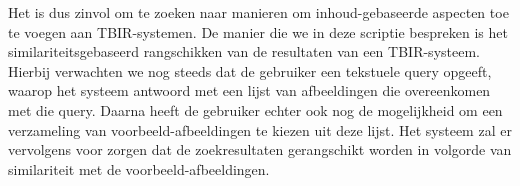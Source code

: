 Het is dus zinvol om te zoeken naar manieren om inhoud-gebaseerde aspecten toe te voegen aan
TBIR-systemen. De manier die we in deze scriptie bespreken is het 
similariteitsgebaseerd rangschikken van de resultaten van een TBIR-systeem. Hierbij verwachten we
nog steeds dat de gebruiker een tekstuele query opgeeft, waarop het systeem antwoord met een 
lijst van afbeeldingen die overeenkomen met die query. Daarna heeft de gebruiker echter ook nog 
de mogelijkheid om een verzameling van voorbeeld-afbeeldingen te kiezen uit deze lijst. Het 
systeem zal er vervolgens voor zorgen dat de zoekresultaten gerangschikt worden in 
volgorde van similariteit met de voorbeeld-afbeeldingen.

